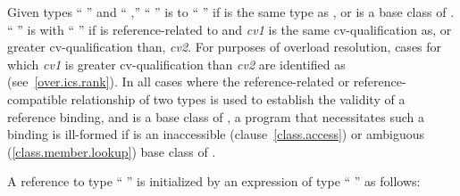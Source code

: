 \pnum
Given types `` '' and `` ,''
`` '' is  to
%
`` '' if
is the same type as
,
or
is a base class of
.
`` '' is 
%
with `` '' if
is reference-related to
and
\textit{cv1}
is the same cv-qualification as, or greater cv-qualification than,
\textit{cv2}.
For purposes of overload resolution, cases for which
\textit{cv1}
is greater cv-qualification than
\textit{cv2}
are identified as
(see~\ref{over.ics.rank}).
In all cases where the reference-related or reference-compatible relationship
of two types is used to establish the validity of a reference binding, and
is a base class of
,
a program that necessitates such a binding is ill-formed if
is an inaccessible (clause~\ref{class.access}) or ambiguous (\ref{class.member.lookup})
base class of
.

\pnum
A reference to type `` '' is initialized by
an expression of type `` '' as follows:%

